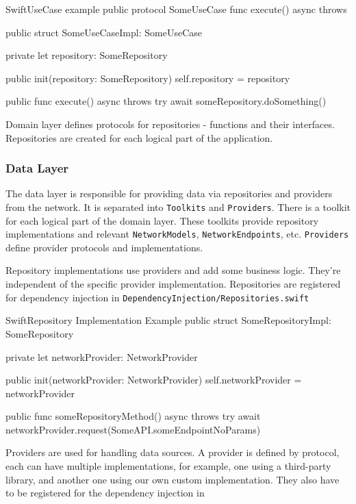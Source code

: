 \documentclass[
  biblatex = false,
  language=english,
  figures=false,
  sourcecodes,
  glossaries,
  index
]{kidiplom}
\begin{document}
\FloatBarrier
\begin{kicode}{Swift}{}{UseCase example}
public protocol SomeUseCase {
    func execute() async throws
}

public struct SomeUseCaseImpl: SomeUseCase {
    
    private let repository: SomeRepository
    
    public init(repository: SomeRepository) {
        self.repository = repository
    }
    
    public func execute() async throws {
        try await someRepository.doSomething()
    }
}
\end{kicode}
\FloatBarrier

Domain layer defines protocols for repositories - functions and their interfaces. Repositories are created for each logical part of the application.

\subsubsection{Data Layer}
The data layer is responsible for providing data via repositories and providers from the network. It is separated into \texttt{Toolkits} and \texttt{Providers}. There is a toolkit for each logical part of the domain layer. These toolkits provide repository implementations and relevant \texttt{NetworkModels}, \texttt{NetworkEndpoints}, etc. \texttt{Providers} define provider protocols and implementations.

Repository implementations use providers and add some business logic. They're independent of the specific provider implementation. Repositories are registered for dependency injection in \texttt{DependencyInjection/Repositories.swift}

\FloatBarrier
\begin{kicode}{Swift}{}{Repository Implementation Example}
public struct SomeRepositoryImpl: SomeRepository {
    
    private let networkProvider: NetworkProvider
    
    public init(networkProvider: NetworkProvider) {
        self.networkProvider = networkProvider
    }
    
    public func someRepositoryMethod() async throws {
        try await networkProvider.request(SomeAPI.someEndpointNoParams)
    }
}
\end{kicode}
\FloatBarrier

Providers are used for handling data sources. A provider is defined by protocol, each can have multiple implementations, for example, one using a third-party library, and another one using our own custom implementation. They also have to be registered for the dependency injection in 
\end{document}
